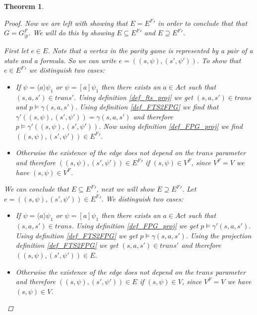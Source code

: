 \documentclass[]{article}
\newtheorem{theorem}{Theorem}[section]
\begin{document}
\begin{theorem}
\begin{proof}
	Now we are left with showing that $E = {E^F}'$ in order to conclude that that $G = G^F_{|p}$. We will do this by showing $E \subseteq {E^F}'$ and $E \supseteq {E^F}'$.
	
	First let $e \in E$. Note that a vertex in the parity game is represented by a pair of a state and a formula. So we can write $e = ((s,\psi),(s',\psi'))$. To show that $e \in {E^F}'$ we distinguish two cases:
	\begin{itemize}
		\item  If $\psi = \langle a \rangle \psi_1$ or $\psi = [a] \psi_1$ then there exists an $a \in Act$ such that $(s,a,s') \in trans'$. Using definition \ref{def_fts_proj} we get $(s,a,s') \in trans$ and $p \models \gamma(s,a,s')$. Using definition \ref{def_FTS2FPG} we find that $\gamma'((s,\psi),(s',\psi')) = \gamma(s,a,s')$ and therefore $p \models \gamma'((s,\psi),(s',\psi'))$. Now using definition \ref{def_FPG_proj} we find $((s,\psi),(s',\psi')) \in {E^F}'$.
		\item Otherwise the existence of the edge does not depend on the $trans$ parameter and therefore $((s,\psi),(s',\psi')) \in {E^F}'$ if $(s,\psi) \in V^F$, since $V^F = V$ we have $(s,\psi) \in V^F$.
	\end{itemize}
	We can conclude that $E \subseteq {E^F}'$, next we will show $E \supseteq {E^F}'$. Let $e = ((s,\psi),(s',\psi')) \in {E^F}'$. We distinguish two cases:
	\begin{itemize}
		\item If $\psi = \langle a \rangle \psi_1$ or $\psi = [a] \psi_1$ then there exists an $a \in Act$ such that $(s,a,s') \in trans$. Using definition \ref{def_FPG_proj} we get $p \models \gamma'(s,a,s')$. Using definition \ref{def_FTS2FPG} we get $p \models \gamma(s,a,s')$. Using the projection definition \ref{def_FTS2FPG} we get $(s,a,s') \in trans'$ and therefore $((s,\psi),(s',\psi'))\in E$.
		\item Otherwise the existence of the edge does not depend on the $trans$ parameter and therefore $((s,\psi),(s',\psi')) \in E$ if $(s,\psi) \in V$, since $V^F = V$ we have $(s,\psi) \in V$.
	\end{itemize}
	\end{proof}
\end{theorem}
\end{document}
